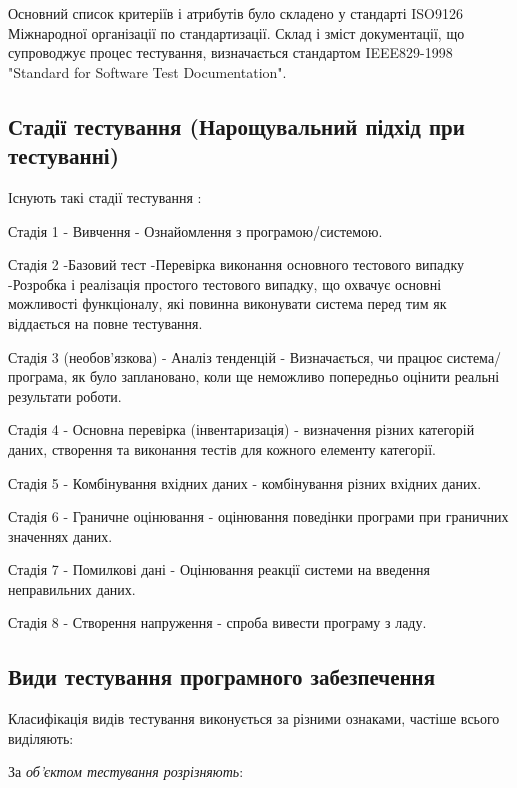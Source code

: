 Основний список критеріїв і атрибутів було складено
у стандарті ISO9126 Міжнародної організації по стандартизації.
Склад і зміст документації, що супроводжує процес тестування,
визначається стандартом IEEE829-1998 "Standard for Software Test Documentation".

\subsection{Стадії тестування (Нарощувальний підхід при тестуванні)}

Існують такі стадії тестування \cite{testing-black,iso-software-eng}:

Стадія 1 - Вивчення - Ознайомлення з програмою/системою.

Стадія 2 -Базовий тест -Перевірка виконання основного тестового випадку 
-Розробка і реалізація простого тестового випадку,
що охвачує основні можливості функціоналу, які повинна виконувати система
перед тим як віддається на повне тестування.

Стадія 3 (необов’язкова) - Аналіз тенденцій
- Визначається, чи працює система/програма, як було заплановано,
коли ще неможливо попередньо оцінити реальні результати роботи.

Стадія 4 - Основна перевірка (інвентаризація) - визначення різних категорій даних,
створення та виконання тестів для кожного елементу категорії.

Стадія 5 - Комбінування вхідних даних - комбінування різних вхідних даних.

Стадія 6 - Граничне оцінювання - оцінювання поведінки програми при граничних значеннях даних.

Стадія 7 - Помилкові дані - Оцінювання реакції системи на введення неправильних даних.

Стадія 8 - Створення напруження - спроба вивести програму з ладу.

\subsection{Види тестування програмного забезпечення}

Класифікація видів тестування виконується за різними ознаками,
частіше всього виділяють:

За \emph{об’єктом тестування розрізняють}:

